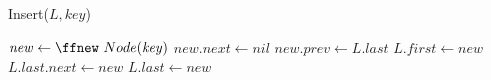 \documentclass[20pt,a4paper,landscape]{extarticle}
\begin{document}
\pagestyle{empty}
\noindent


\begin{procedure}
\LinesNumberedHidden
{}
\caption{Insert($L,key$)}
\BlankLine
$\mathit{new} \leftarrow \ffnew~ Node(\mathit{key})$ \;
$\mathit{new.next} \leftarrow \mathit{nil}$ \;
$\mathit{new.prev} \leftarrow \mathit{L.last}$ \;
 {
	$\mathit{L.first} \leftarrow \mathit{new}$ \;
}
{
	$\mathit{L.last.next} \leftarrow \mathit{new}$ \;
}
$\mathit{L.last} \leftarrow \mathit{new}$ \;
\end{procedure}
\end{document}
